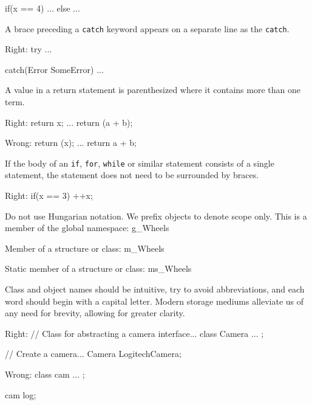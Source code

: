 if(x == 4) {
    ...
}
else {
    ...
}
\stopCodeExample

\item
A brace preceding a {\tt catch} keyword appears on a separate line as the {\tt catch}. 

Right:
\startCodeExample
try
{
    ...
}

catch(Error SomeError)
{
    ...
}
\stopCodeExample

\item
A value in a return statement is parenthesized where it contains more than one term.

Right:
\startCodeExample
{
    return x;
}
...
{
    return (a + b);
}
\stopCodeExample

Wrong:
\startCodeExample
{
    return (x);
}
...
{
    return a + b;
}
\stopCodeExample

\item
If the body of an {\tt if}, {\tt for}, {\tt while} or similar statement consists of a single statement, the statement does not need to be surrounded by braces.

Right:
\startCodeExample
if(x == 3)
  ++x;
\stopCodeExample

\stopitemize


\startitemize[4]
\item
Do not use Hungarian notation. We prefix objects to denote scope only. This is a member of the global namespace:
\startCodeExample
g_Wheels
\stopCodeExample

Member of a structure or class:
\startCodeExample
m_Wheels
\stopCodeExample

Static member of a structure or class:
\startCodeExample
ms_Wheels
\stopCodeExample

\item
Class and object names should be intuitive, try to avoid abbreviations, and each word should begin with a capital letter. Modern storage mediums alleviate us of any need for brevity, allowing for greater clarity.


Right:
\startCodeExample
// Class for abstracting a camera interface...
class Camera
{
    ...
};

// Create a camera...
Camera LogitechCamera;
\stopCodeExample

Wrong:
\startCodeExample
class cam
{
    ...
};

cam log;
\stopCodeExample

\stopitemize

